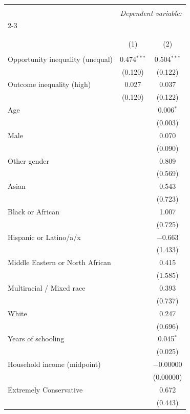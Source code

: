 
\begin{table}[H] \centering 
  \caption{} 
  \label{} 
\tiny 
\begin{tabular}{@{\extracolsep{5pt}}lcc} 
\\[-1.8ex]\hline 
\hline \\[-1.8ex] 
 & \multicolumn{2}{c}{\textit{Dependent variable:}} \\ 
\cline{2-3} 
\\[-1.8ex] & \multicolumn{2}{c}{} \\ 
\\[-1.8ex] & (1) & (2)\\ 
\hline \\[-1.8ex] 
 Opportunity inequality (unequal) & 0.474$^{***}$ & 0.504$^{***}$ \\ 
  & (0.120) & (0.122) \\ 
  Outcome inequality (high) & 0.027 & 0.037 \\ 
  & (0.120) & (0.122) \\ 
  Age &  & 0.006$^{*}$ \\ 
  &  & (0.003) \\ 
  Male &  & 0.070 \\ 
  &  & (0.090) \\ 
  Other gender &  & 0.809 \\ 
  &  & (0.569) \\ 
  Asian &  & 0.543 \\ 
  &  & (0.723) \\ 
  Black or African &  & 1.007 \\ 
  &  & (0.725) \\ 
  Hispanic or Latino/a/x &  & $-$0.663 \\ 
  &  & (1.433) \\ 
  Middle Eastern or North African &  & 0.415 \\ 
  &  & (1.585) \\ 
  Multiracial / Mixed race &  & 0.393 \\ 
  &  & (0.737) \\ 
  White &  & 0.247 \\ 
  &  & (0.696) \\ 
  Years of schooling &  & 0.045$^{*}$ \\ 
  &  & (0.025) \\ 
  Household income (midpoint) &  & $-$0.00000 \\ 
  &  & (0.00000) \\ 
  Extremely Conservative &  & 0.672 \\ 
  &  & (0.443) \\ 

\end{tabular}
\end{table}

